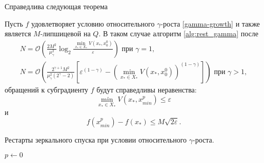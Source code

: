     Справедлива следующая теорема
    \begin{theorem} \label{simple_restart}
        Пусть $f$ удовлетворяет условию относительного $\gamma$-роста \eqref{gamma-growth} и также является $M$-липшицевой на $Q$. В таком случае алгоритм \ref{alg:rest_gamma} после 
        \begin{equation}
        \begin{aligned}
           N =\mathcal{O}\left(\frac{2 M^2}{\mu_{\gamma}^2} \log_2{\frac{\min\limits_{x_* \in X_*}{V(x_*, x_0^0)}}{\varepsilon}}\right) \text{ при } \gamma = 1, \\
           N = \mathcal{O}\left(\frac{2^{\gamma + 1} M^2}{\mu_{\gamma}^2 (2^{\gamma} - 2)} \left[\varepsilon^{(1 - \gamma)} - \left(\min\limits_{x_* \in X_*}{V(x_*, x_0^0)}\right)^{(1 - \gamma)}\right]\right) \text{ при } \gamma > 1,
        \end{aligned}
        \end{equation}
        обращений к субградиенту $f$ будут справедливы неравенства:
        \begin{equation}
            \min_{x_* \in X_*}{V(x_*, x_{min}^p)} \leq \varepsilon
        \end{equation}
        и
        \begin{equation}
            f(x_{min}^p) - f(x_*) \leq M \sqrt{2 \varepsilon}.  
        \end{equation}
    \end{theorem}

    \begin{algorithm}[htp]
        \caption{Рестарты зеркального спуска при условии относительного $\gamma$-роста.}
        \label{alg:rest_gamma}
        $p \gets 0$\;
    \end{algorithm}

